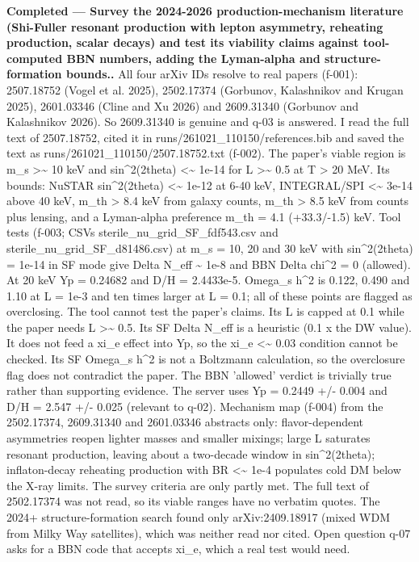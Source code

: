 \documentclass[11pt,a4paper]{article}
\begin{document}
\textbf{Completed --- Survey the 2024-2026 production-mechanism literature (Shi-Fuller resonant production with lepton asymmetry, reheating production, scalar decays) and test its viability claims against tool-computed BBN numbers, adding the Lyman-alpha and structure-formation bounds..} All four arXiv IDs resolve to real papers (f-001): 2507.18752 (Vogel et al. 2025), 2502.17374 (Gorbunov, Kalashnikov and Krugan 2025), 2601.03346 (Cline and Xu 2026) and 2609.31340 (Gorbunov and Kalashnikov 2026). So 2609.31340 is genuine and q-03 is answered. I read the full text of 2507.18752, cited it in runs/261021\_110150/references.bib and saved the text as runs/261021\_110150/2507.18752.txt (f-002). The paper's viable region is m\_s \textgreater{}\textasciitilde{} 10 keV and sin\textasciicircum{}2(2theta) \textless{}\textasciitilde{} 1e-14 for L \textgreater{}\textasciitilde{} 0.5 at T \textgreater{} 20 MeV. Its bounds: NuSTAR sin\textasciicircum{}2(2theta) \textless{}\textasciitilde{} 1e-12 at 6-40 keV, INTEGRAL/SPI \textless{}\textasciitilde{} 3e-14 above 40 keV, m\_th \textgreater{} 8.4 keV from galaxy counts, m\_th \textgreater{} 8.5 keV from counts plus lensing, and a Lyman-alpha preference m\_th = 4.1 (+33.3/-1.5) keV. Tool tests (f-003; CSVs sterile\_nu\_grid\_SF\_fdf543.csv and sterile\_nu\_grid\_SF\_d81486.csv) at m\_s = 10, 20 and 30 keV with sin\textasciicircum{}2(2theta) = 1e-14 in SF mode give Delta N\_eff \textasciitilde{} 1e-8 and BBN Delta chi\textasciicircum{}2 = 0 (allowed). At 20 keV Yp = 0.24682 and D/H = 2.4433e-5. Omega\_s h\textasciicircum{}2 is 0.122, 0.490 and 1.10 at L = 1e-3 and ten times larger at L = 0.1; all of these points are flagged as overclosing. The tool cannot test the paper's claims. Its L is capped at 0.1 while the paper needs L \textgreater{}\textasciitilde{} 0.5. Its SF Delta N\_eff is a heuristic (0.1 x the DW value). It does not feed a xi\_e effect into Yp, so the \textbar{}xi\_e\textbar{} \textless{}\textasciitilde{} 0.03 condition cannot be checked. Its SF Omega\_s h\textasciicircum{}2 is not a Boltzmann calculation, so the overclosure flag does not contradict the paper. The BBN 'allowed' verdict is trivially true rather than supporting evidence. The server uses Yp = 0.2449 +/- 0.004 and D/H = 2.547 +/- 0.025 (relevant to q-02). Mechanism map (f-004) from the 2502.17374, 2609.31340 and 2601.03346 abstracts only: flavor-dependent asymmetries reopen lighter masses and smaller mixings; large L saturates resonant production, leaving about a two-decade window in sin\textasciicircum{}2(2theta); inflaton-decay reheating production with BR \textless{}\textasciitilde{} 1e-4 populates cold DM below the X-ray limits. The survey criteria are only partly met. The full text of 2502.17374 was not read, so its viable ranges have no verbatim quotes. The 2024+ structure-formation search found only arXiv:2409.18917 (mixed WDM from Milky Way satellites), which was neither read nor cited. Open question q-07 asks for a BBN code that accepts xi\_e, which a real test would need.
\end{document}
